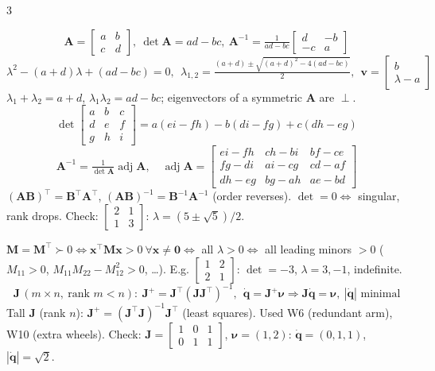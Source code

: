 \begin{multicols}{3}
\nopagebreak[4]
\begin{fbx}
\[\mathbf A=\begin{bmatrix}a&b\\c&d\end{bmatrix},\ \det\mathbf A=ad-bc,\ \mathbf A^{-1}=\tfrac1{ad-bc}\begin{bmatrix}d&-b\\-c&a\end{bmatrix}\]
\[\lambda^2-(a+d)\lambda+(ad-bc)=0,\ \ \lambda_{1,2}=\tfrac{(a+d)\pm\sqrt{(a+d)^2-4(ad-bc)}}2,\ \ \mathbf v=\begin{bmatrix}b\\\lambda-a\end{bmatrix}\]
$\lambda_1+\lambda_2=a+d$, $\lambda_1\lambda_2=ad-bc$; eigenvectors of a symmetric $\mathbf A$ are $\perp$.
\[\det\begin{bmatrix}a&b&c\\d&e&f\\g&h&i\end{bmatrix}=a(ei-fh)-b(di-fg)+c(dh-eg)\]
\[\mathbf A^{-1}=\tfrac1{\det\mathbf A}\operatorname{adj}\mathbf A,\quad\operatorname{adj}\mathbf A=\begin{bmatrix}ei-fh&ch-bi&bf-ce\\fg-di&ai-cg&cd-af\\dh-eg&bg-ah&ae-bd\end{bmatrix}\]
$(\mathbf{AB})^\top=\mathbf B^\top\mathbf A^\top$, $(\mathbf{AB})^{-1}=\mathbf B^{-1}\mathbf A^{-1}$ (order reverses). $\det=0\iff$ singular, rank drops. Check: $\begin{bmatrix}2&1\\1&3\end{bmatrix}$: $\lambda=(5\pm\sqrt5)/2$. \chk
\end{fbx}
\begin{fbx}
$\mathbf M=\mathbf M^\top\succ0\iff\mathbf x^\top\mathbf M\mathbf x>0\ \forall\mathbf x\ne\mathbf 0\iff$ all $\lambda>0\iff$ all leading minors $>0$ ($M_{11}>0$, $M_{11}M_{22}-M_{12}^2>0$, \dots). E.g. $\begin{bmatrix}1&2\\2&1\end{bmatrix}$: $\det=-3$, $\lambda=3,-1$, indefinite. \chk
\[\mathbf J\,(m\!\times\!n,\ \text{rank }m<n):\ \mathbf J^{+}=\mathbf J^\top(\mathbf J\mathbf J^\top)^{-1},\ \ \dot{\mathbf q}=\mathbf J^{+}\boldsymbol\nu\Rightarrow\mathbf J\dot{\mathbf q}=\boldsymbol\nu,\ |\dot{\mathbf q}|\text{ minimal}\]
Tall $\mathbf J$ (rank $n$): $\mathbf J^{+}=(\mathbf J^\top\mathbf J)^{-1}\mathbf J^\top$ (least squares). Used W6 (redundant arm), W10 (extra wheels). Check: $\mathbf J=\begin{bmatrix}1&0&1\\0&1&1\end{bmatrix}$, $\boldsymbol\nu=(1,2)$: $\dot{\mathbf q}=(0,1,1)$, $|\dot{\mathbf q}|=\sqrt2$. \chk
\end{fbx}


\end{multicols}
